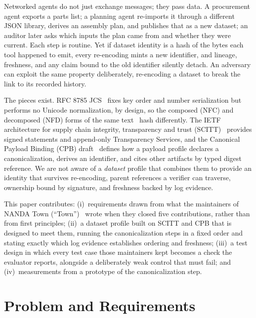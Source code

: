 \documentclass[conference]{IEEEtran}
\begin{document}
Networked agents do not just exchange messages; they pass data. A procurement agent exports a parts list; a planning agent re-imports it through a different JSON library, derives an assembly plan, and publishes that as a new dataset; an auditor later asks which inputs the plan came from and whether they were current. Each step is routine. Yet if dataset identity is a hash of the bytes each tool happened to emit, every re-encoding mints a new identifier, and lineage, freshness, and any claim bound to the old identifier silently detach. An adversary can exploit the same property deliberately, re-encoding a dataset to break the link to its recorded history.

The pieces exist. RFC 8785 JCS~\cite{rfc8785} fixes key order and number serialization but performs no Unicode normalization, by design, so the composed (NFC) and decomposed (NFD) forms of the same text~\cite{uax15} hash differently. The IETF architecture for supply chain integrity, transparency and trust (SCITT)~\cite{rfc9943} provides signed statements and append-only Transparency Services, and the Canonical Payload Binding (CPB) draft~\cite{cpb03} defines how a payload profile declares a canonicalization, derives an identifier, and cites other artifacts by typed digest reference. We are not aware of a \emph{dataset} profile that combines them to provide an identity that survives re-encoding, parent references a verifier can traverse, ownership bound by signature, and freshness backed by log evidence.

This paper contributes:
(i)~requirements drawn from what the maintainers of NANDA Town (``Town'')~\cite{town} wrote when they closed five contributions, rather than from first principles;
(ii)~a dataset profile built on SCITT and CPB that is designed to meet them, running the canonicalization steps in a fixed order and stating exactly which log evidence establishes ordering and freshness;
(iii)~a test design in which every test case those maintainers kept becomes a check the evaluator reports, alongside a deliberately weak control that must fail; and
(iv)~measurements from a prototype of the canonicalization step.

\section{Problem and Requirements}
\end{document}

